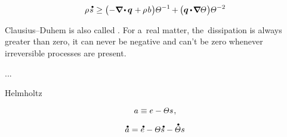 \begin{equation}\label{clausiusduheminequality.differential}
\rho \hspace{.15ex} \mathdotabove{s} \hspace{.1ex}
\geq
\bigl( - \boldnabla \hspace{-0.2ex} \dotp \hspace{-0.1ex} \heatfluxvector \hspace{.1ex} + \hspace{-0.1ex} \rho \hspace{.2ex} b \hspace{.1ex} \bigr) \temperaturefield^{-1} \hspace{-0.15ex}
+ \hspace{-0.1ex} \bigl( \heatfluxvector \hspace{-0.1ex} \dotp \hspace{-0.25ex} \boldnabla \temperaturefield \hspace{.1ex} \bigr) \temperaturefield^{-2}
\end{equation}

Clausius\hbox{--}Duhem is also called .
For a~real matter, the~dissipation is always greater than zero, it can never be negative and can’t be zero whenever irreversible processes are present.

...

Helmholtz 

\nopagebreak\vspace{-0.33em}\begin{equation}\label{helmholtzfreeenergy.permassunit}
a \equiv e - \temperaturefield s
\hspace{.15ex} ,
\end{equation}

\[
\mathdotabove{a} = \mathdotabove{e} - \temperaturefield \mathdotabove{s} - \mathdotabove{\temperaturefield} s
\]



